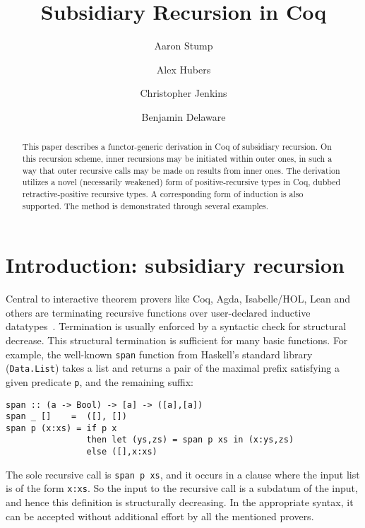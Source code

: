 \documentclass[a4paper,USenglish]{lipics-v2021}
\title{Subsidiary Recursion in Coq} %
\author{Aaron Stump}{Computer Science Dept., The University of Iowa, USA \and \url{http://www.cs.uiowa.edu/~astump/}}{aaron-stump@uiowa.edu}{http://orcid.org/0000-0002-9720-0003}{}%
\author{Alex Hubers}{Computer Science, The University of Iowa, USA}{alexander-hubers@uiowa.edu}{}{}
\author{Christopher Jenkins}{Computer Science, The University of Iowa, USA}{alexander-hubers@uiowa.edu}{http://orcid.org/
0000-0002-5434-5018}{}
\author{Benjamin Delaware}{Computer Science, Purdue University, USA \and \url{https://www.cs.purdue.edu/homes/bendy/}}{bendy@purdue.edu}{}{}
\begin{document}
\maketitle

\begin{abstract}
  This paper describes a functor-generic derivation in Coq of
  subsidiary recursion.  On this recursion scheme, inner recursions
  may be initiated within outer ones, in such a way that outer
  recursive calls may be made on results from inner ones.  The
  derivation utilizes a novel (necessarily weakened) form of
  positive-recursive types in Coq, dubbed retractive-positive
  recursive types.  A corresponding form of induction is also
  supported.  The method is demonstrated through several examples.
\end{abstract}

\section{Introduction: subsidiary recursion}
\label{sec:intro}

Central to interactive theorem provers like Coq, Agda, Isabelle/HOL,
Lean and others are terminating recursive functions over user-declared
inductive datatypes~\cite{agda,coq,isabelle-hol,lean}.  Termination is
usually enforced by a syntactic check for structural decrease.  This
structural termination is sufficient for many basic functions.  For
example, the well-known \texttt{span} function from Haskell's standard
library (\verb|Data.List|) takes a list and returns a pair of the
maximal prefix satisfying a given predicate \verb|p|, and the
remaining suffix:
\begin{verbatim}
span :: (a -> Bool) -> [a] -> ([a],[a])
span _ []    =  ([], [])
span p (x:xs) = if p x
                then let (ys,zs) = span p xs in (x:ys,zs)
                else ([],x:xs)
\end{verbatim}
\noindent The sole recursive call is \verb|span p xs|, and it occurs
in a clause where the input list is of the form \verb|x:xs|.  So the
input to the recursive call is a subdatum of the input, and hence this
definition is structurally decreasing.  In the appropriate syntax, it
can be accepted without additional effort by all the mentioned
provers.
\end{document}
